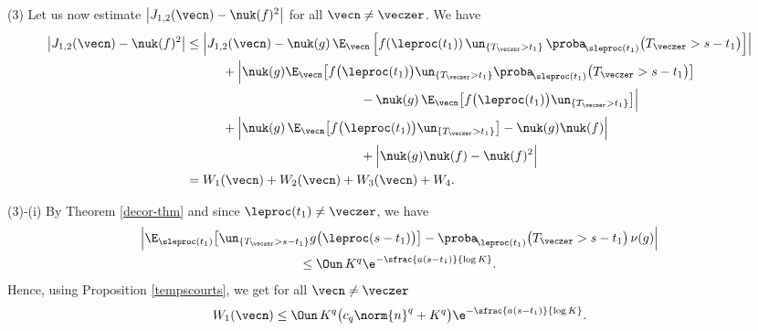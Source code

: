 (3)
Let us now estimate $\left| J_{1,2}(\vecn) -\nuk(f)^2\right|$ for all $\vecn\neq \veczer$.
We have
\begin{align*}
\left|J_{1,2}(\vecn) -\nuk(f)^2\right| &\leq \Bigl|J_{1,2}(\vecn)
-\nuk(g)\, \E_{\vecn}\,\Bigl[f(\leproc(t_1)) \, \un_{\{T_{\veczer} >t_1\}} \, \proba_{\!\sleproc(t_{1})}\bigl(T_{\veczer} >s-t_1\bigr)\Bigr]\Bigr|\\
& \hspace*{1cm}+ \Bigl|\nuk(g) \E_{\vecn}\bigl[f\bigl(\leproc(t_{1})\bigr)\un_{\{T_{\veczer}>t_{1}\}}
\proba_{\!\sleproc(t_{1})}\bigl(T_{\veczer}>s-t_{1}\bigr)\bigr]\\
&\hspace*{4.8cm}-\nuk(g) \,\E_{\vecn}\bigl[f\bigl(\leproc(t_{1})\bigr)\un_{\{T_{\veczer}>t_{1}\}}\bigr] \Bigr|\\
& \hspace*{1cm}+ \Bigl | \nuk(g)\,\E_{\vecn}\bigl[f\bigl(\leproc(t_{1})\bigr)
\un_{\{T_{\veczer}>t_{1}\}}\bigr]-\nuk(g)\nuk(f) \Bigr|\\
&\hspace*{4.8cm}+ \Bigl|\nuk(g)\nuk(f) - \nuk(f)^2 \Bigr|\\
&= W_{1}(\vecn)+W_{2}(\vecn)+W_{3}(\vecn)+W_{4}.
\end{align*}

(3)-(i) By Theorem \ref{decor-thm} and since $\leproc(t_1)\neq \veczer$, we have
\begin{multline*}
\Big|
\E_{\sleproc(t_{1})} \bigl[\un_{\{T_{\veczer} >s-t_1\}}g\bigl(\leproc(s-t_1)\bigr)\bigr]
- \proba_{\!\leproc(t_{1})}\bigl(T_{\veczer} >s-t_1\bigr)\, \nu(g)
\Big|\\
\leq \Oun\, K^q \e^{-\sfrac{a(s-t_{1})}{\log K}}.
\end{multline*}
Hence, using Proposition \ref{tempscourts}, we get for all $\vecn\neq \veczer$
\[
W_{1}(\vecn)\leq
\Oun \, K^q \bigl(c_q \norm{n}^{q} + K^q\bigr) \e^{- \sfrac{a(s-t_{1})}{\log K}}.
\]


